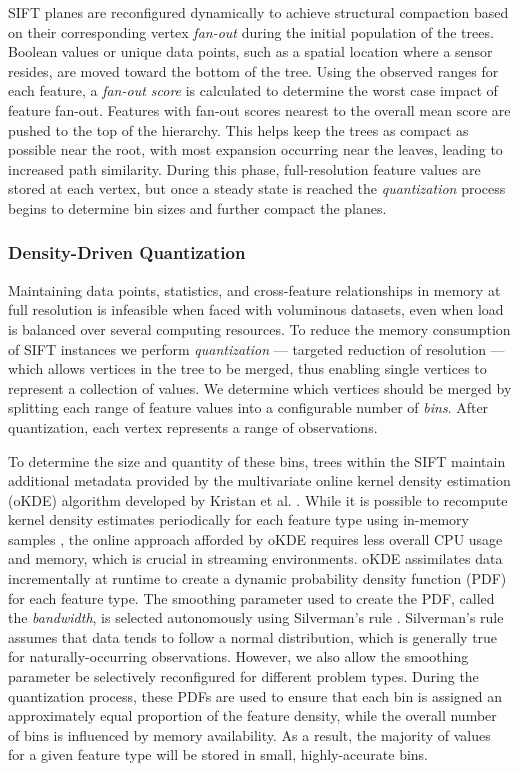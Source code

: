 SIFT planes are reconfigured dynamically to achieve structural compaction based on their corresponding vertex \emph{fan-out} during the initial population of the trees. Boolean values or unique data points, such as a spatial location where a sensor resides, are moved toward the bottom of the tree. Using the observed ranges for each feature, a \emph{fan-out score} is calculated to determine the worst case impact of feature fan-out. Features with fan-out scores nearest to the overall mean score are pushed to the top of the hierarchy. This helps keep the trees as compact as possible near the root, with most expansion occurring near the leaves, leading to increased path similarity.  During this phase, full-resolution feature values are stored at each vertex, but once a steady state is reached the \emph{quantization} process begins to determine bin sizes and further compact the planes.

\subsubsection{Density-Driven Quantization}
Maintaining data points, statistics, and cross-feature relationships in memory at full resolution is infeasible when faced with voluminous datasets, even when load is balanced over several computing resources. To reduce the memory consumption of SIFT instances we perform \emph{quantization} --- targeted reduction of resolution --- which allows vertices in the tree to be merged, thus enabling single vertices to represent a collection of values. We determine which vertices should be merged by splitting each range of feature values into a configurable number of \emph{bins}. After quantization, each vertex represents a range of observations.

To determine the size and quantity of these bins, trees within the SIFT maintain additional metadata provided by the multivariate online kernel density estimation (oKDE) algorithm developed by Kristan et al. \cite{kristan2011multivariate}. While it is possible to recompute kernel density estimates periodically for each feature type using in-memory samples \cite{malensek2013autonomously}, the online approach afforded by oKDE requires less overall CPU usage and memory, which is crucial in streaming environments.  oKDE assimilates data incrementally at runtime to create a dynamic probability density function (PDF) for each feature type. The smoothing parameter used to create the PDF, called the \emph{bandwidth}, is selected autonomously using Silverman's rule \cite{silverman1986density}. Silverman's rule assumes that data tends to follow a normal distribution, which is generally true for naturally-occurring observations. However, we also allow the smoothing parameter be selectively reconfigured for different problem types. During the quantization process, these PDFs are used to ensure that each bin is assigned an approximately equal proportion of the feature density, while the overall number of bins is influenced by memory availability. As a result, the majority of values for a given feature type will be stored in small, highly-accurate bins.


